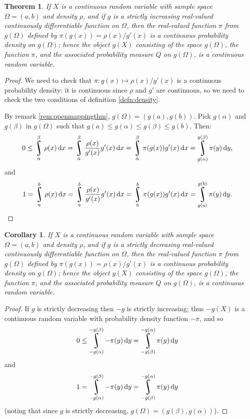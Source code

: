 \documentclass[a4paper,leqno]{article}
\DeclareMathOperator*{\rint}{\scalerel*{\rotatebox{17}{$\!\int\!$}}{\int}}
\numberwithin{equation}{section}
\newtheorem{thm}[equation]{Theorem}
\newtheorem{cor}[equation]{Corollary}
\theoremstyle{definition}
\theoremstyle{remark}
\begin{document}
\begin{thm}
  If $ X $ is a continuous random variable with sample space $ \Omega = (a,b) $ and density $ \rho $, and if $ g $ is a strictly increasing
  real-valued continuously differentiable function on $ \Omega $, then the real-valued function $ \pi $ from $ g(\Omega) $ defined
  by $ \pi(g(x)) = \rho(x)/g'(x) $ is a continuous probability density on $ g(\Omega) $; hence the object $ g(X) $ consisting of
  the space $ g(\Omega) $, the function $ \pi $, and the associated probability measure $ Q $ on $ g(\Omega) $, is a continuous random variable.
\end{thm}
\begin{proof}
  We need to check that $ \pi : g(x) \mapsto \rho(x)/g'(x) $ is a continuous probability density: it is continuous since $ \rho $ and $ g' $
  are continuous, so we need to check the two conditions of definition \ref{defn:density}.

  By remark \ref{rem:openmappingthm}, $ g(\Omega) = (g(a),g(b)) $. Pick $ g(\alpha) $ and $ g(\beta) $ in $ g(\Omega) $
  such that $ g(a) \leq g(\alpha) \leq g(\beta) \leq g(b) $. Then:
  \begin{displaymath}
    0 \leq \rint_\alpha^\beta \rho(x) \dif{x} = \rint_\alpha^\beta \frac{\rho(x)}{g'(x)} g'(x) \dif{x} = \rint_\alpha^\beta \pi(g(x)) g'(x) \dif{x}
      = \rint_{g(\alpha)}^{g(\beta)} \pi(y) \dif{y},
  \end{displaymath}
  and
  \begin{displaymath}
    1 = \rint_a^b \rho(x) \dif{x} = \rint_a^b \frac{\rho(x)}{g'(x)} g'(x) \dif{x} = \rint_a^b \pi(g(x)) g'(x) \dif{x}
      = \rint_{g(a)}^{g(b)} \pi(y) \dif{y}.
  \end{displaymath}
\end{proof}

\begin{cor}
  If $ X $ is a continuous random variable with sample space $ \Omega = (a,b) $ and density $ \rho $, and if $ g $ is a strictly \emph{decreasing}
  real-valued continuously differentiable function on $ \Omega $, then the real-valued function $ \pi $ from $ g(\Omega) $ defined
  by $ \pi(g(x)) = \rho(x)/g'(x) $ is a continuous probability density on $ g(\Omega) $; hence the object $ g(X) $ consisting of
  the space $ g(\Omega) $, the function $ \pi $, and the associated probability measure $ Q $ on $ g(\Omega) $, is a continuous random variable.
\end{cor}
\begin{proof}
  If $ g $ is strictly decreasing then $ -g $ is strictly increasing; thus $ -g(X) $ is a continuous random variable with probability density
  function $ -\pi $, and so
  \begin{displaymath}
    0 \leq \rint_{-g(\alpha)}^{-g(\beta)} -\pi(y) \dif{y} = \rint_{-g(\beta)}^{-g(\alpha)} \pi(y) \dif{y}
  \end{displaymath}
  and
  \begin{displaymath}
    1 = \rint_{-g(\alpha)}^{-g(\beta)} -\pi(y) \dif{y} = \rint_{-g(\beta)}^{-g(\alpha)} \pi(y) \dif{y}
  \end{displaymath}
  (noting that since $ g $ is strictly decreasing, $ g(\Omega) = (g(\beta),g(\alpha)) $).
\end{proof}
\end{document}
